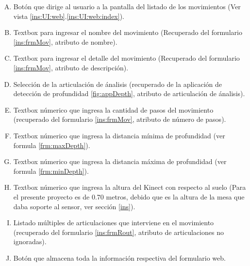 \begin{enumerate}[A.]
\item Bot\'on que dirige al usuario a la pantalla del listado de los movimientos (Ver vista \ref{ins:UI:web}.\ref{ins:UI:web:index}).
\item Textbox para ingresar el nombre del movimiento (Recuperado del formulario \ref{ins:frmMov}, atributo de nombre).
\item Textbox para ingresar el detalle del movimiento (Recuperado del formulario \ref{ins:frmMov}, atributo de descripci\'on).
\item Selecci\'on de la articulaci\'on de \'analisis (recuperado de la aplicaci\'on de detecci\'on de profundidad \ref{fig:appDepth}, atributo de articulaci\'on de \'analisis).
\item Textbox n\'umerico que ingresa la cantidad de pasos del movimiento (recuperado del formulario  \ref{ins:frmMov}, atributo de n\'umero de pasos).
\item Textbox n\'umerico que ingresa la distancia m\'inima de profundidad (ver formula \ref{frm:maxDepth}).
\item Textbox n\'umerico que ingresa la distancia m\'axima de profundidad (ver formula \ref{frm:minDepth}).
\item Textbox n\'umerico que ingresa la altura del Kinect con respecto al suelo (Para el presente proyecto es de 0.70 metros, debido que es la altura de la mesa que daba soporte al sensor, ver secci\'on \ref{ins}).
\item Listado m\'ultiples de articulaciones que interviene en el movimiento (recuperado del formulario  \ref{ins:frmRout}, atributo de articulaciones no ignoradas).
\item Bot\'on que almacena toda la informaci\'on respectiva del formulario web.
\end{enumerate}
